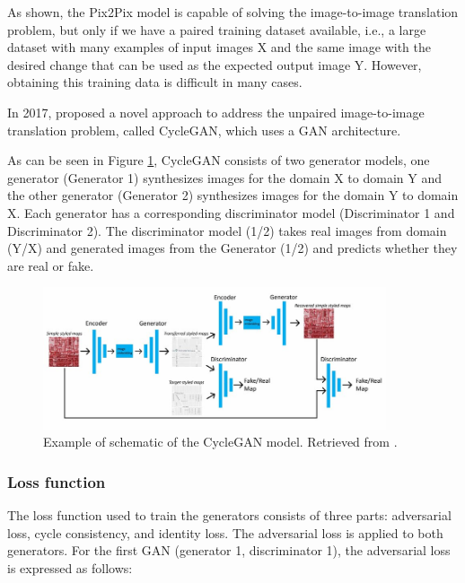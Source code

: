 As shown, the Pix2Pix model is capable of solving the image-to-image translation problem, but only if we have a paired training dataset available, i.e., a large dataset with many examples of input images X and the same image with the desired change that can be used as the expected output image Y. However, obtaining this training data is difficult in many cases. 

In 2017, \citet{cycleGAN:original} proposed a novel approach to address the unpaired image-to-image translation problem, called CycleGAN, which uses a \ac{GAN} architecture. 

As can be seen in Figure \ref{fig:cyclegan}, CycleGAN consists of two generator models, one generator (Generator 1) synthesizes images for the domain X to domain Y and the other generator (Generator 2) synthesizes images for the domain Y to domain X. Each generator has a corresponding discriminator model (Discriminator 1 and Discriminator 2). The discriminator model (1/2) takes real images from domain (Y/X) and generated images from the Generator (1/2) and predicts whether they are real or fake. 

\begin{figure}[!htb]
  \centering
  \includegraphics[width=0.90\textwidth]{Images/Data-flow-of-CycleGAN-in-this-research.jpg}
  \caption[Example of schematic of the CycleGAN model.]{Example of schematic of the CycleGAN model. Retrieved from \cite{cyclegan:image}.}
  \label{fig:cyclegan}
\end{figure}

\subsubsection*{Loss function}

The loss function used to train the generators consists of three parts: adversarial loss, cycle consistency, and identity loss. The adversarial loss  is applied to both generators. For the first \ac{GAN} (generator 1, discriminator 1), the adversarial loss is expressed as follows:

